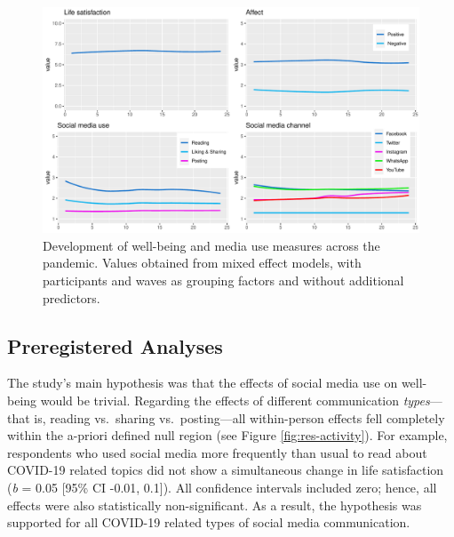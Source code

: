 \documentclass[
  english,
  man,mask,floatsintext]{apa6}
\begin{document}
\begin{figure}
\includegraphics[width=\textwidth]{figures/fig_descriptives} \caption{Development of well-being and media use measures across the pandemic. Values obtained from mixed effect models, with participants and waves as grouping factors and without additional predictors.}\label{fig:fig-desc}
\end{figure}

\hypertarget{preregistered-analyses}{%
\subsection{Preregistered Analyses}\label{preregistered-analyses}}

The study's main hypothesis was that the effects of social media use on well-being would be trivial.
Regarding the effects of different communication \emph{types}---that is, reading vs.~sharing vs.~posting---all within-person effects fell completely within the a-priori defined null region (see Figure \ref{fig:res-activity}).
For example, respondents who used social media more frequently than usual to read about COVID-19 related topics did not show a simultaneous change in life satisfaction (\emph{b} = 0.05 {[}95\% CI -0.01, 0.1{]}).
All confidence intervals included zero; hence, all effects were also statistically non-significant.
As a result, the hypothesis was supported for all COVID-19 related types of social media communication.
\end{document}

